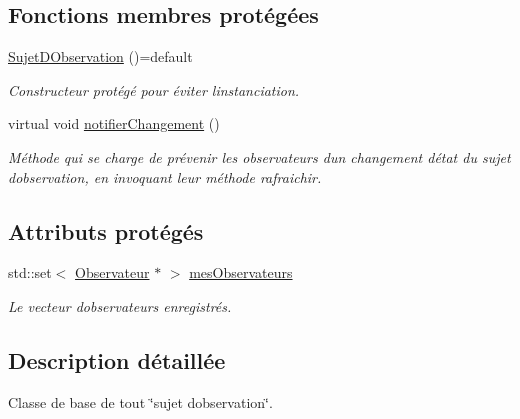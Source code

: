 \subsection*{Fonctions membres protégées}
\begin{DoxyCompactItemize}
\item 
\mbox{\label{class_sujet_d_observation_a148acc7f82782cd27456f89252ca0c23}} 
\mbox{\hyperlink{class_sujet_d_observation_a148acc7f82782cd27456f89252ca0c23}{Sujet\+D\+Observation}} ()=default
\begin{DoxyCompactList}\small\item\em Constructeur protégé pour éviter l\textquotesingle{}instanciation. \end{DoxyCompactList}\item 
virtual void \mbox{\hyperlink{class_sujet_d_observation_ab4a833d911377a2dd3c83ce8ce3ac540}{notifier\+Changement}} ()
\begin{DoxyCompactList}\small\item\em Méthode qui se charge de prévenir les observateurs d\textquotesingle{}un changement d\textquotesingle{}état du sujet d\textquotesingle{}observation, en invoquant leur méthode rafraichir. \end{DoxyCompactList}\end{DoxyCompactItemize}
\subsection*{Attributs protégés}
\begin{DoxyCompactItemize}
\item 
\mbox{\label{class_sujet_d_observation_aa4dce06573ce3c9a7d896010706ab781}} 
std\+::set$<$ \mbox{\hyperlink{class_observateur}{Observateur}} $\ast$ $>$ \mbox{\hyperlink{class_sujet_d_observation_aa4dce06573ce3c9a7d896010706ab781}{mes\+Observateurs}}
\begin{DoxyCompactList}\small\item\em Le vecteur d\textquotesingle{}observateurs enregistrés. \end{DoxyCompactList}\end{DoxyCompactItemize}


\subsection{Description détaillée}
Classe de base de tout \char`\"{}sujet d\textquotesingle{}observation\char`\"{}. 

